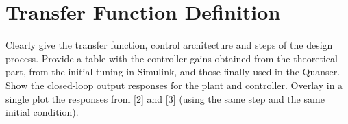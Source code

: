 \section{Transfer Function
Definition}\label{transfer-function-definition}

Clearly give the transfer function, control architecture and steps of
the design process. Provide a table with the controller gains obtained
from the theoretical part, from the initial tuning in Simulink, and
those finally used in the Quanser. Show the closed-loop output responses
for the plant and controller. Overlay in a single plot the responses
from {[}2{]} and {[}3{]} (using the same step and the same initial
condition).
